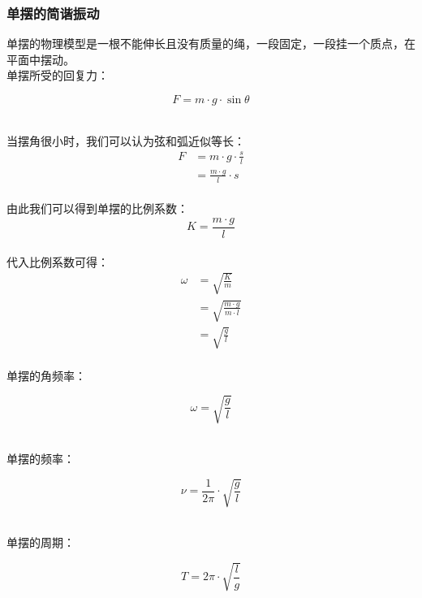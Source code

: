 \documentclass[UTF8]{ctexart}
\begin{document}
\subsubsection{单摆的简谐振动}
    单摆的物理模型是一根不能伸长且没有质量的绳，一段固定，一段挂一个质点，在平面中摆动。\\[3mm]
    单摆所受的回复力：
    \begin{large}
        \begin{equation*}
            F=m\cdot g\cdot \sin{\theta}
        \end{equation*}
    \end{large}\\
    当摆角很小时，我们可以认为弦和弧近似等长：\vspace{5pt}
    \setcounter{equation}{0}
    \begin{align}
        F
        &=m\cdot g\cdot \frac{s}{l}\\[5mm]
        &=\frac{m\cdot g}{l}\cdot s
    \end{align}\\
    由此我们可以得到单摆的比例系数：\vspace{5pt}
    \begin{equation}
        K=\frac{m\cdot g}{l}
    \end{equation}\\
    代入比例系数可得：
    \begin{align}
        \omega
        &=\sqrt{\frac{K}{m}}\\[5mm]
        &=\sqrt{\frac{m\cdot g}{m\cdot l}}\\[5mm]
        &=\sqrt{\frac{g}{l}}
    \end{align}\\
    单摆的角频率：
    \begin{large}
        \begin{equation*}
            \omega=\sqrt{\frac{g}{l}}
        \end{equation*}
    \end{large}\\
    单摆的频率：
    \begin{large}
        \begin{equation*}
            \nu=\frac{1}{2\pi}\cdot\sqrt{\frac{g}{l}}
        \end{equation*}
    \end{large}\\
    单摆的周期：
    \begin{large}
        \begin{equation*}
            T=2\pi\cdot\sqrt{\frac{l}{g}}
        \end{equation*}
    \end{large}\\
\end{document}
